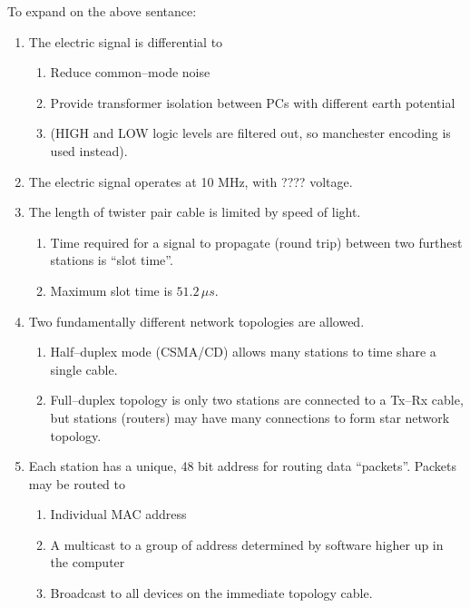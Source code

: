 \documentclass{article}
\begin{document}
To expand on the above sentance:
\begin{enumerate}
\item The electric signal is differential to
	\begin{enumerate}
		\item Reduce common--mode noise
		\item Provide transformer isolation between PCs with different earth potential
		\item (HIGH and LOW logic levels are filtered out, so manchester encoding is used instead).
	\end{enumerate}
\item The electric signal operates at 10 MHz, with ???? voltage.
\item The length of twister pair cable is limited by speed of light.
	\begin{enumerate}
		\item Time required for a signal to propagate (round trip) between two furthest stations is ``slot time''.
		\item Maximum slot time is $51.2\,\mu s$.
	\end{enumerate}
\item Two fundamentally different network topologies are allowed.
	\begin{enumerate}
		\item Half--duplex mode (CSMA/CD) allows many stations to time share a single cable.
		\item Full--duplex topology is only two stations are connected to a Tx--Rx cable,
			but stations (routers) may have many connections to form star network topology.
	\end{enumerate}
\item Each station has a unique, 48 bit address for routing data ``packets''. Packets may be routed to
	\begin{enumerate}
		\item Individual MAC address
		\item A multicast to a group of address determined by software higher up in the computer
		\item Broadcast to all devices on the immediate topology cable.
	\end{enumerate}
\end{enumerate}
\end{document}
